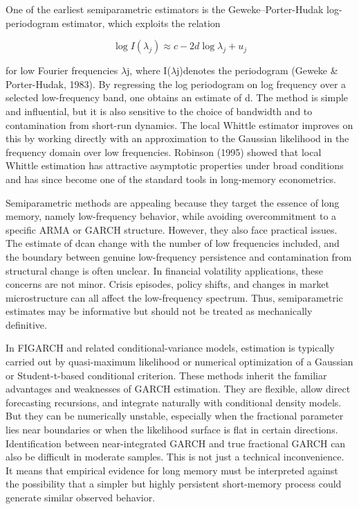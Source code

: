 \documentclass[12pt]{article}
\begin{document}
One of the earliest semiparametric estimators is the Geweke--Porter-Hudak log-periodogram estimator, which exploits the relation

\[\log I(\lambda_j) \approx c - 2d\log\lambda_j + u_j\]

for low Fourier frequencies $\lambda$j, where I($\lambda$j)denotes the periodogram (Geweke \& Porter-Hudak, 1983). By regressing the log periodogram on log frequency over a selected low-frequency band, one obtains an estimate of d. The method is simple and influential, but it is also sensitive to the choice of bandwidth and to contamination from short-run dynamics. The local Whittle estimator improves on this by working directly with an approximation to the Gaussian likelihood in the frequency domain over low frequencies. Robinson (1995) showed that local Whittle estimation has attractive asymptotic properties under broad conditions and has since become one of the standard tools in long-memory econometrics.

Semiparametric methods are appealing because they target the essence of long memory, namely low-frequency behavior, while avoiding overcommitment to a specific ARMA or GARCH structure. However, they also face practical issues. The estimate of dcan change with the number of low frequencies included, and the boundary between genuine low-frequency persistence and contamination from structural change is often unclear. In financial volatility applications, these concerns are not minor. Crisis episodes, policy shifts, and changes in market microstructure can all affect the low-frequency spectrum. Thus, semiparametric estimates may be informative but should not be treated as mechanically definitive.

In FIGARCH and related conditional-variance models, estimation is typically carried out by quasi-maximum likelihood or numerical optimization of a Gaussian or Student-t-based conditional criterion. These methods inherit the familiar advantages and weaknesses of GARCH estimation. They are flexible, allow direct forecasting recursions, and integrate naturally with conditional density models. But they can be numerically unstable, especially when the fractional parameter lies near boundaries or when the likelihood surface is flat in certain directions. Identification between near-integrated GARCH and true fractional GARCH can also be difficult in moderate samples. This is not just a technical inconvenience. It means that empirical evidence for long memory must be interpreted against the possibility that a simpler but highly persistent short-memory process could generate similar observed behavior.
\end{document}
